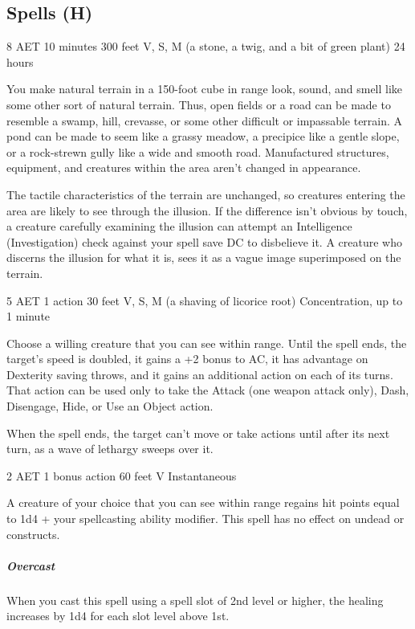 \subsection{Spells (H)}
\label{spell:hallucinatory-terrain}
{8 AET}
{10 minutes}
{300 feet}
{V, S, M (a stone, a twig, and a bit of green plant)}
{24 hours}

You make natural terrain in a 150-foot cube in range look, sound, and smell like some other sort of natural terrain. Thus, open fields or a road can be made to resemble a swamp, hill, crevasse, or some other difficult or impassable terrain. A pond can be made to seem like a grassy meadow, a precipice like a gentle slope, or a rock-strewn gully like a wide and smooth road. Manufactured structures, equipment, and creatures within the area aren't changed in appearance.

The tactile characteristics of the terrain are unchanged, so creatures entering the area are likely to see through the illusion. If the difference isn't obvious by touch, a creature carefully examining the illusion can attempt an Intelligence (Investigation) check against your spell save DC to disbelieve it. A creature who discerns the illusion for what it is, sees it as a vague image superimposed on the terrain.

\label{spell:haste}
{5 AET}
{1 action}
{30 feet}
{V, S, M (a shaving of licorice root)}
{Concentration, up to 1 minute}

Choose a willing creature that you can see within range. Until the spell ends, the target's speed is doubled, it gains a +2 bonus to AC, it has advantage on Dexterity saving throws, and it gains an additional action on each of its turns. That action can be used only to take the Attack (one weapon attack only), Dash, Disengage, Hide, or Use an Object action.

When the spell ends, the target can't move or take actions until after its next turn, as a wave of lethargy sweeps over it.

\label{spell:healing-word}
{2 AET}
{1 bonus action}
{60 feet}
{V}
{Instantaneous}

A creature of your choice that you can see within range regains hit points equal to 1d4 + your spellcasting ability modifier. This spell has no effect on undead or constructs.
\subparagraph*{Overcast} When you cast this spell using a spell slot of 2nd level or higher, the healing increases by 1d4 for each slot level above 1st.

